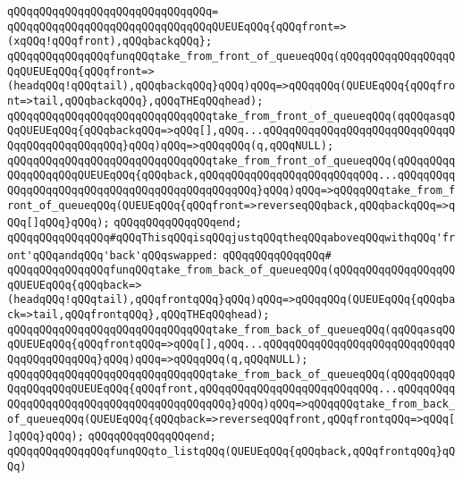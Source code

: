 \verb|qQQqqQQqqQQqqQQqqQQqqQQqqQQqqQQq=|\newline
\verb|qQQqqQQqqQQqqQQqqQQqqQQqqQQqqQQqQUEUEqQQq{qQQqfront=>(xqQQq!qQQqfront),qQQqbackqQQq};|\newline
\newline
\newline
\verb|qQQqqQQqqQQqqQQqfunqQQqtake_from_front_of_queueqQQq(qQQqqQQqqQQqqQQqqQQqQUEUEqQQq{qQQqfront=>(headqQQq!qQQqtail),qQQqbackqQQq}qQQq)qQQq=>qQQqqQQq(QUEUEqQQq{qQQqfront=>tail,qQQqbackqQQq},qQQqTHEqQQqhead);|\newline
\verb|qQQqqQQqqQQqqQQqqQQqqQQqqQQqqQQqtake_from_front_of_queueqQQq(qqQQqasqQQqQUEUEqQQq{qQQqbackqQQq=>qQQq[],qQQq...qQQqqQQqqQQqqQQqqQQqqQQqqQQqqQQqqQQqqQQqqQQqqQQq}qQQq)qQQq=>qQQqqQQq(q,qQQqNULL);|\newline
\verb|qQQqqQQqqQQqqQQqqQQqqQQqqQQqqQQqtake_from_front_of_queueqQQq(qQQqqQQqqQQqqQQqqQQqQUEUEqQQq{qQQqback,qQQqqQQqqQQqqQQqqQQqqQQqqQQq...qQQqqQQqqQQqqQQqqQQqqQQqqQQqqQQqqQQqqQQqqQQqqQQq}qQQq)qQQq=>qQQqqQQqtake_from_front_of_queueqQQq(QUEUEqQQq{qQQqfront=>reverseqQQqback,qQQqbackqQQq=>qQQq[]qQQq}qQQq);|\newline
\verb|qQQqqQQqqQQqqQQqend;|\newline
\newline
\verb|qQQqqQQqqQQqqQQq#qQQqThisqQQqisqQQqjustqQQqtheqQQqaboveqQQqwithqQQq'front'qQQqandqQQq'back'qQQqswapped:|\newline
\verb|qQQqqQQqqQQqqQQq#|\newline
\verb|qQQqqQQqqQQqqQQqfunqQQqtake_from_back_of_queueqQQq(qQQqqQQqqQQqqQQqqQQqQUEUEqQQq{qQQqback=>(headqQQq!qQQqtail),qQQqfrontqQQq}qQQq)qQQq=>qQQqqQQq(QUEUEqQQq{qQQqback=>tail,qQQqfrontqQQq},qQQqTHEqQQqhead);|\newline
\verb|qQQqqQQqqQQqqQQqqQQqqQQqqQQqqQQqtake_from_back_of_queueqQQq(qqQQqasqQQqQUEUEqQQq{qQQqfrontqQQq=>qQQq[],qQQq...qQQqqQQqqQQqqQQqqQQqqQQqqQQqqQQqqQQqqQQqqQQq}qQQq)qQQq=>qQQqqQQq(q,qQQqNULL);|\newline
\verb|qQQqqQQqqQQqqQQqqQQqqQQqqQQqqQQqtake_from_back_of_queueqQQq(qQQqqQQqqQQqqQQqqQQqQUEUEqQQq{qQQqfront,qQQqqQQqqQQqqQQqqQQqqQQqqQQq...qQQqqQQqqQQqqQQqqQQqqQQqqQQqqQQqqQQqqQQqqQQq}qQQq)qQQq=>qQQqqQQqtake_from_back_of_queueqQQq(QUEUEqQQq{qQQqback=>reverseqQQqfront,qQQqfrontqQQq=>qQQq[]qQQq}qQQq);|\newline
\verb|qQQqqQQqqQQqqQQqend;|\newline
\newline
\newline
\verb|qQQqqQQqqQQqqQQqfunqQQqto_listqQQq(QUEUEqQQq{qQQqback,qQQqfrontqQQq}qQQq)|\newline
